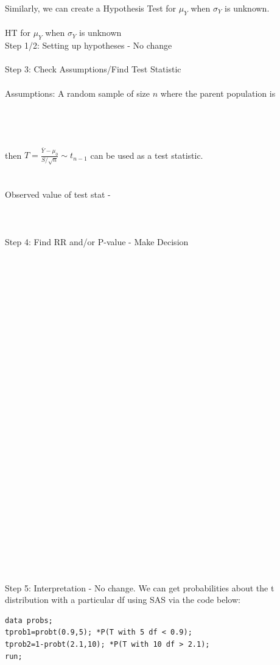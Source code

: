 \newpage

Similarly, we can create a Hypothesis Test for $\mu_Y$ when $\sigma_Y$ is unknown.\\~\\

\large HT for $\mu_Y$ when $\sigma_Y$ is unknown \normalsize\\
Step 1/2: Setting up hypotheses - No change\\~\\
Step 3: Check Assumptions/Find Test Statistic\\~\\
Assumptions: A random sample of size $n$ where the parent population is \underbar{~~~~~~~~~~~~~~~~~~~~~~~~~~~~~~~~~~~~~~~~~~~~~~}\\~\\~\\
\underbar{~~~~~~~~~~~~~~~~~~~~~~~~~~~~~~~~~~~~~~~~~~~~~~~~~~~~~~~~~~~~~~~~~~~~~~~~~~~~~~~~~~~~~~~~~~~~~~~~~~~~~~~~~~~~~~~~~~~~~~~~~~~~~~~~~~~~~~}\\~\\%
then $T=\frac{\bar{Y}-\mu_{0}}{S/\sqrt{n}}\sim t_{n-1}$ can be used as a test statistic.\\~\\~\\
Observed value of test stat - \\~\\~\\~\\
Step 4: Find RR and/or P-value - Make Decision
\\~\\~\\~\\~\\~\\~\\~\\~\\~\\~\\~\\~\\~\\~\\~\\~\\~\\~\\~\\~\\~\\~\\~\\~\\~\\~\\~\\~\\
Step 5: Interpretation - No change.
\newpage
We can get probabilities about the t distribution with a particular df using SAS via the code below:\\
\begin{verbatim}
data probs;
tprob1=probt(0.9,5); *P(T with 5 df < 0.9);
tprob2=1-probt(2.1,10); *P(T with 10 df > 2.1);
run;
\end{verbatim}

